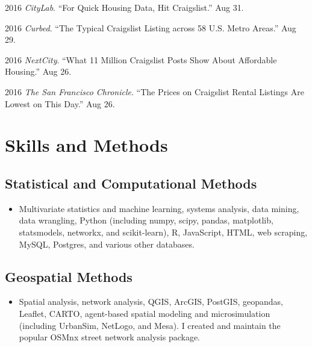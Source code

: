 \documentclass{academiccv}
\begin{document}
\begin{tablist}
\item 2016 \tab \emph{CityLab}. \enquote{For Quick Housing Data, Hit Craigslist.} Aug 31.

\item 2016 \tab \emph{Curbed}. \enquote{The Typical Craigslist Listing across 58 U.S. Metro Areas.} Aug 29.

\item 2016 \tab \emph{NextCity}. \enquote{What 11 Million Craigslist Posts Show About Affordable Housing.} Aug 26.

\item 2016 \tab \emph{The San Francisco Chronicle}. \enquote{The Prices on Craigslist Rental Listings Are Lowest on This Day.} Aug 26.

\end{tablist}



\section*{Skills and Methods}

\subsection*{Statistical and Computational Methods}

\begin{itemize}
	
\item Multivariate statistics and machine learning, systems analysis, data mining, data wrangling, Python (including numpy, scipy, pandas, matplotlib, statsmodels, networkx, and scikit-learn), R, JavaScript, HTML, web scraping, MySQL, Postgres, and various other databases.

\end{itemize}

\subsection*{Geospatial Methods}

\begin{itemize}

\item Spatial analysis, network analysis, QGIS, ArcGIS, PostGIS, geopandas, Leaflet, CARTO, agent-based spatial modeling and microsimulation (including UrbanSim, NetLogo, and Mesa). I created and maintain the popular OSMnx street network analysis package.

\end{itemize}
\end{document}
